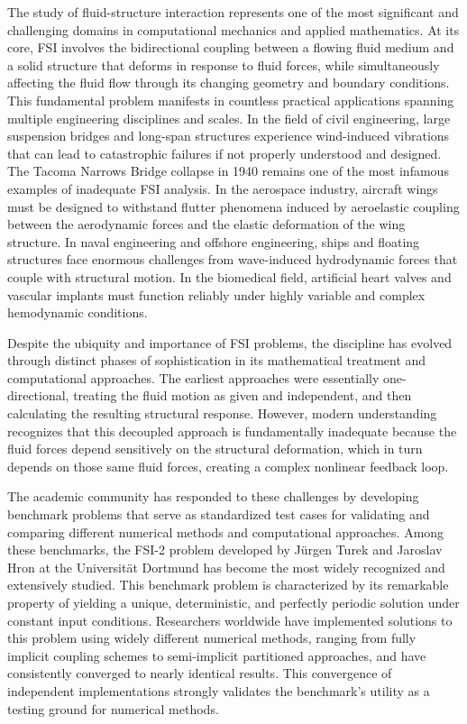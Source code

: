 ﻿\documentclass[a4paper,11pt]{article}
\theoremstyle{definition}
\begin{document}
The study of fluid-structure interaction represents one of the most significant and challenging domains in computational mechanics and applied mathematics. At its core, FSI involves the bidirectional coupling between a flowing fluid medium and a solid structure that deforms in response to fluid forces, while simultaneously affecting the fluid flow through its changing geometry and boundary conditions. This fundamental problem manifests in countless practical applications spanning multiple engineering disciplines and scales. In the field of civil engineering, large suspension bridges and long-span structures experience wind-induced vibrations that can lead to catastrophic failures if not properly understood and designed. The Tacoma Narrows Bridge collapse in 1940 remains one of the most infamous examples of inadequate FSI analysis. In the aerospace industry, aircraft wings must be designed to withstand flutter phenomena induced by aeroelastic coupling between the aerodynamic forces and the elastic deformation of the wing structure. In naval engineering and offshore engineering, ships and floating structures face enormous challenges from wave-induced hydrodynamic forces that couple with structural motion. In the biomedical field, artificial heart valves and vascular implants must function reliably under highly variable and complex hemodynamic conditions.

Despite the ubiquity and importance of FSI problems, the discipline has evolved through distinct phases of sophistication in its mathematical treatment and computational approaches. The earliest approaches were essentially one-directional, treating the fluid motion as given and independent, and then calculating the resulting structural response. However, modern understanding recognizes that this decoupled approach is fundamentally inadequate because the fluid forces depend sensitively on the structural deformation, which in turn depends on those same fluid forces, creating a complex nonlinear feedback loop.

The academic community has responded to these challenges by developing benchmark problems that serve as standardized test cases for validating and comparing different numerical methods and computational approaches. Among these benchmarks, the FSI-2 problem developed by Jürgen Turek and Jaroslav Hron at the Universität Dortmund has become the most widely recognized and extensively studied. This benchmark problem is characterized by its remarkable property of yielding a unique, deterministic, and perfectly periodic solution under constant input conditions. Researchers worldwide have implemented solutions to this problem using widely different numerical methods, ranging from fully implicit coupling schemes to semi-implicit partitioned approaches, and have consistently converged to nearly identical results. This convergence of independent implementations strongly validates the benchmark's utility as a testing ground for numerical methods.
\end{document}
